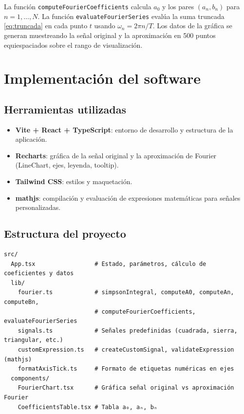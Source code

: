 \documentclass[12pt,a4paper]{article}
\begin{document}
La función \texttt{computeFourierCoefficients} calcula \(a_0\) y los pares \((a_n, b_n)\) para \(n=1,\ldots,N\). La función \texttt{evaluateFourierSeries} evalúa la suma truncada \eqref{eq:truncada} en cada punto \(t\) usando \(\omega_n = 2\pi n/T\). Los datos de la gráfica se generan muestreando la señal original y la aproximación en 500 puntos equiespaciados sobre el rango de visualización.

\section{Implementación del software}

\subsection{Herramientas utilizadas}

\begin{itemize}
  \item \textbf{Vite + React + TypeScript}: entorno de desarrollo y estructura de la aplicación.
  \item \textbf{Recharts}: gráfica de la señal original y la aproximación de Fourier (LineChart, ejes, leyenda, tooltip).
  \item \textbf{Tailwind CSS}: estilos y maquetación.
  \item \textbf{mathjs}: compilación y evaluación de expresiones matemáticas para señales personalizadas.
\end{itemize}

\subsection{Estructura del proyecto}

\begin{verbatim}
src/
  App.tsx                 # Estado, parámetros, cálculo de coeficientes y datos
  lib/
    fourier.ts            # simpsonIntegral, computeA0, computeAn, computeBn,
                          # computeFourierCoefficients, evaluateFourierSeries
    signals.ts            # Señales predefinidas (cuadrada, sierra, triangular, etc.)
    customExpression.ts   # createCustomSignal, validateExpression (mathjs)
    formatAxisTick.ts     # Formato de etiquetas numéricas en ejes
  components/
    FourierChart.tsx      # Gráfica señal original vs aproximación Fourier
    CoefficientsTable.tsx # Tabla a₀, aₙ, bₙ
\end{verbatim}
\end{document}
